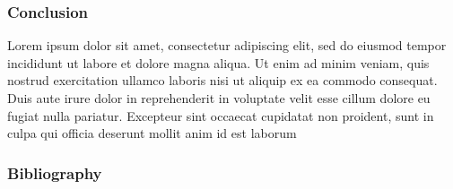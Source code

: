 \documentclass[10pt]{beamer}
\begin{document}
\begin{frame}
  \frametitle{Conclusion}
  \begin{block}{}
    Lorem ipsum dolor sit amet, consectetur adipiscing elit, sed do eiusmod tempor incididunt ut labore et dolore magna aliqua. Ut enim ad minim veniam, quis nostrud exercitation ullamco laboris nisi ut aliquip ex ea commodo consequat. Duis aute irure dolor in reprehenderit in voluptate velit esse cillum dolore eu fugiat nulla pariatur. Excepteur sint occaecat cupidatat non proident, sunt in culpa qui officia deserunt mollit anim id est laborum
  \end{block} 
\end{frame}


\begin{frame}
  \frametitle{Bibliography}
  \begin{block}{}
    {
        \small
    }
  \end{block} 
\end{frame}
\end{document}
